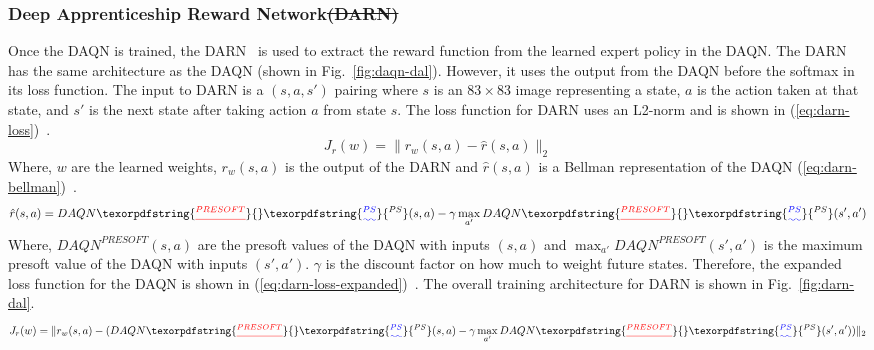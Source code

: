 \documentclass[12pt,american]{report}
\providecommand{\DIFaddtex}[1]{{\protect\color{blue}\uwave{#1}}} %
\providecommand{\DIFdeltex}[1]{{\protect\color{red}\sout{#1}}}                      %
\providecommand{\DIFaddbegin}{} %
\providecommand{\DIFaddend}{} %
\providecommand{\DIFdelbegin}{} %
\providecommand{\DIFdelend}{} %
\providecommand{\DIFadd}[1]{\texorpdfstring{\DIFaddtex{#1}}{#1}} %
\providecommand{\DIFdel}[1]{\texorpdfstring{\DIFdeltex{#1}}{}} %
\newcommand{\DIFscaledelfig}{0.5}
\newlength{\DIFdelgraphicswidth} %
\newlength{\DIFdelgraphicsheight} %
\newcommand{\DIFaddincludegraphics}[2][]{{\color{blue}\fbox{\DIFOincludegraphics[#1]{#2}}}} %
\newcommand{\DIFdelincludegraphics}[2][]{%
\sbox{\DIFdelgraphicsbox}{\DIFOincludegraphics[#1]{#2}}%
\settoboxwidth{\DIFdelgraphicswidth}{\DIFdelgraphicsbox} %
\settoboxtotalheight{\DIFdelgraphicsheight}{\DIFdelgraphicsbox} %
\scalebox{\DIFscaledelfig}{%
\parbox[b]{\DIFdelgraphicswidth}{\usebox{\DIFdelgraphicsbox}\\[-\baselineskip] \rule{\DIFdelgraphicswidth}{0em}}\llap{\resizebox{\DIFdelgraphicswidth}{\DIFdelgraphicsheight}{%
\setlength{\unitlength}{\DIFdelgraphicswidth}%
\begin{picture}(1,1)%
\thicklines\linethickness{2pt} %
{\color[rgb]{1,0,0}\put(0,0){\framebox(1,1){}}}%
{\color[rgb]{1,0,0}\put(0,0){\line( 1,1){1}}}%
{\color[rgb]{1,0,0}\put(0,1){\line(1,-1){1}}}%
\end{picture}%
}\hspace*{3pt}}} %
} %
\DeclareRobustCommand{\DIFaddbegin}{\DIFOaddbegin \let\includegraphics\DIFaddincludegraphics} %
\DeclareRobustCommand{\DIFaddend}{\DIFOaddend \let\includegraphics\DIFOincludegraphics} %
\DeclareRobustCommand{\DIFdelbegin}{\DIFOdelbegin \let\includegraphics\DIFdelincludegraphics} %
\DeclareRobustCommand{\DIFdelend}{\DIFOaddend \let\includegraphics\DIFOincludegraphics} %
\begin{document}
\subsubsection{Deep Apprenticeship Reward Network\DIFdelbegin \DIFdel{(DARN)}\DIFdelend }
Once the DAQN is trained, the DARN~\cite{markovikj2014deep} is used to extract the reward function from the learned expert policy in the DAQN.  The DARN has the same architecture as the DAQN (shown in Fig.~\ref{fig:daqn-dal}). However, it uses the output from the DAQN before the softmax in its loss function.  The input to DARN is a $(s,a,s')$ pairing where $s$ is an $83\times 83$ image representing a state, $a$ is the action taken at that state, and $s'$ is the next state after taking action $a$ from state $s$. The loss function for DARN uses an L2-norm and is shown in (\ref{eq:darn-loss})~\cite{markovikj2014deep}.
\begin{equation}
     \label{eq:darn-loss}
     J_r(w) =\|r_w(s,a) - \hat{r}(s,a) \|_2%
\end{equation}
Where, $w$ are the learned weights, $r_w(s,a)$ is the output of the DARN and $\hat{r}(s,a)$ is a Bellman representation of the DAQN (\ref{eq:darn-bellman})~\cite{markovikj2014deep}.
\begin{equation}
     \label{eq:darn-bellman}
     \hat{r}(s,a) = DAQN\DIFdelbegin \DIFdel{^{PRESOFT}}\DIFdelend \DIFaddbegin \DIFadd{^{PS}}\DIFaddend (s,a) - \gamma \max_{a'}DAQN\DIFdelbegin \DIFdel{^{PRESOFT}}\DIFdelend \DIFaddbegin \DIFadd{^{PS}}\DIFaddend (s',a')%
\end{equation}
Where, \DIFdelbegin \DIFdel{$DAQN^{PRESOFT}(s,a)$ }\DIFdelend \DIFaddbegin \DIFadd{$DAQN^{PS}(s,a)$ }\DIFaddend are the presoft values of the DAQN with inputs $(s,a)$ and \DIFdelbegin \DIFdel{$\max_{a'}DAQN^{PRESOFT}(s',a')$ }\DIFdelend \DIFaddbegin \DIFadd{$\max_{a'}DAQN^{PS}(s',a')$ }\DIFaddend is the maximum presoft value of the DAQN with inputs $(s',a')$. $\gamma$ is the discount factor on how much to weight future states. Therefore, the expanded loss function for the DAQN is shown in (\ref{eq:darn-loss-expanded})~\cite{markovikj2014deep}.  The overall training architecture for DARN is shown in Fig.~\ref{fig:darn-dal}.
\begin{equation}
     \label{eq:darn-loss-expanded}
     J_r(w) =\|r_w(s,a) - (DAQN\DIFdelbegin \DIFdel{^{PRESOFT}}\DIFdelend \DIFaddbegin \DIFadd{^{PS}}\DIFaddend (s,a) - \gamma \max_{a'}DAQN\DIFdelbegin \DIFdel{^{PRESOFT}}\DIFdelend \DIFaddbegin \DIFadd{^{PS}}\DIFaddend (s',a'))\|_2%
\end{equation}
\end{document}
